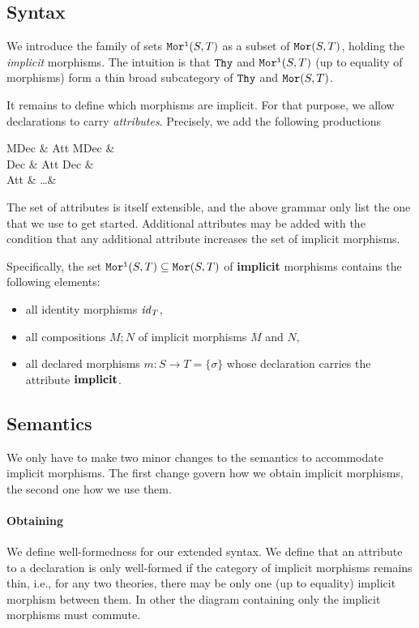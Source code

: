 
\subsection{Syntax}

We introduce the family of sets $\mathtt{Mor^i}(S,T)$ as a subset of $\mathtt{Mor}(S,T)$, holding the \textit{implicit} morphisms.
The intuition is that $\mathtt{Thy}$ and $\mathtt{Mor^i}(S,T)$ (up to equality of morphisms) form a thin broad subcategory of $\mathtt{Thy}$ and $\mathtt{Mor}(S,T)$.

It remains to define which morphisms are implicit.
For that purpose, we allow \mmt declarations to carry \textit{attributes}.
Precisely, we add the following productions
\begin{grammar}
MDec   & Att\; MDec  &  \\
Dec    & Att\; Dec   & \\
Att    &  \alt \ldots & 
\end{grammar}

The set of attributes is itself extensible, and the above grammar only list the one that we use to get started.
Additional attributes may be added with the condition that any additional attribute increases the set of implicit morphisms.

Specifically, the set $\mathtt{Mor^i}(S,T)\subseteq\mathtt{Mor}(S,T)$ of \textbf{implicit} morphisms contains the following elements:
\begin{itemize}
 \item all identity morphisms $\mathit{id}_{T}$,
 \item all compositions $M;N$ of implicit morphisms $M$ and $N$,
 \item all declared morphisms $m:S\to T=\{\sigma\}$ whose declaration carries the attribute $\operatorname{\mathbf{implicit}}$.
\end{itemize}

\subsection{Semantics}

We only have to make two minor changes to the semantics to accommodate implicit morphisms.
The first change govern how we obtain implicit morphisms, the second one how we use them.

\paragraph{Obtaining}
We define well-formedness for our extended syntax.
We define that an attribute to a declaration is only well-formed if the category of implicit morphisms remains thin, i.e., for any two theories, there may be only one (up to equality) implicit morphism between them.
In other the diagram containing only the implicit morphisms must commute.

